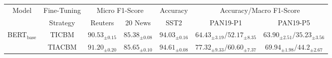 \begin{table*}[t]
  \centering
  \setlength\tabcolsep{0.23em}
  \small{
  \begin{tabular}{|c|c|c|c|c|c|c|}
    \hline
      \multirow{2}{*}{Model} &Fine-Tuning  & \multicolumn{2}{|c|}{Micro F1-Score}&Accuracy&\multicolumn{2}{|c|}{Accuracy/Macro F1-Score}\\
     \cline{3-7}
     & Strategy& 
     Reuters & 20 News & SST2& PAN19-P1&
     PAN19-P5\\
     \hline
    \hline 
    \multirow{2}{*}{BERT$_{\text{base}}$}& TICBM & $90.53_{\pm0.15}$ & $85.38_{\pm0.08}$ & $94.03_{\pm0.16}$  & $64.43_{\pm3.19}/52.17_{\pm8.35}$ & $63.90_{\pm2.51} / 35.23_{\pm3.56}$\\
    & TIACBM & $\mathbf{91.20}_{\pm0.20}$ & $\mathbf{85.65}_{\pm0.10}$ & $\mathbf{94.61}_{\pm0.08}$ & $\mathbf{77.32}_{\pm9.33}/\mathbf{60.60}_{\pm7.37}$ &$\mathbf{69.94}_{\pm1.98}/\mathbf{44.2}_{\pm2.67}$ \\
    \hline
    

\end{tabular}}
\end{table*}
